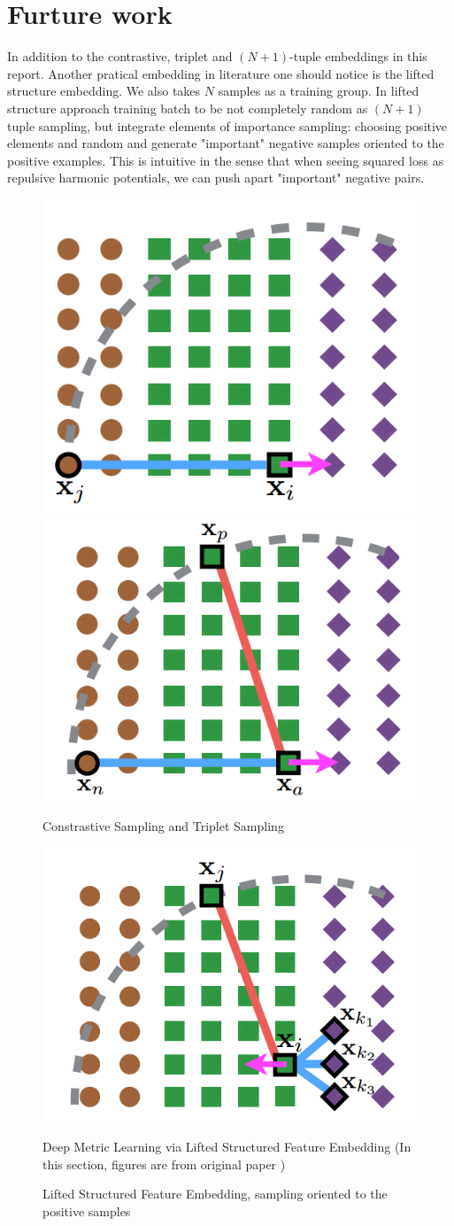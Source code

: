 \documentclass[10pt,twocolumn,letterpaper]{article}
\begin{document}
	\section{Furture work}
	In addition to the contrastive, triplet and $(N+1)$-tuple embeddings in this report. Another pratical embedding in literature one should notice is the lifted structure embedding. We also takes $N$ samples as a training group. In lifted structure approach training batch to be not completely random as $(N+1)$ tuple sampling, but integrate elements of importance sampling: choosing positive elements and random and generate "important" negative samples oriented to the positive examples. This is intuitive in the sense that when seeing squared loss as repulsive harmonic potentials, we can push apart "important" negative pairs. 
				\begin{figure}[t]
				
				\begin{center}
					\includegraphics[width=0.5\linewidth]{constrastiveDemo}\includegraphics[width=0.5\linewidth]{tripletDemo}
					\caption{Constrastive Sampling and Triplet Sampling}
					\includegraphics[width=0.5\linewidth]{liftedDemo}
					\caption{Lifted Structured Feature Embedding, sampling oriented to the positive samples\label{fig:lift}}
				\end{center}
			Deep Metric Learning via Lifted Structured Feature Embedding (In this section, figures are from original paper \cite{lifted}) 
			\end{figure}
\end{document}
